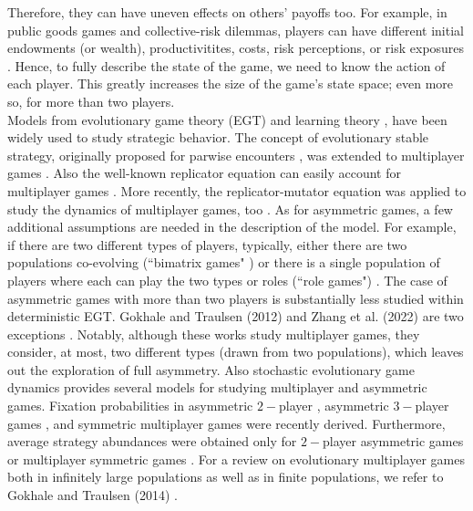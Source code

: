 \documentclass[11pt]{article}
\theoremstyle{plainCl1}
\theoremstyle{plainCl2}
\begin{document}
Therefore, they can have uneven effects on others' payoffs too. For example, in public goods games and collective-risk dilemmas, players can have different initial endowments (or wealth), productivitites, costs, risk perceptions, or risk exposures \cite{Milinski:CC:2011, Vasconcelos:PNAS:2014, Abouchakra:JTB:2014, Hauser:Nature:2019, Merhej:JAIR:2022, Wang:PTRSB:2023}. Hence, to fully describe the state of the game, we need to know the action of each player. This greatly increases the size of the game's state space; even more so, for more than two players. \\


\noindent Models from evolutionary game theory (EGT) \cite{Maynard-Smith:Nature:1973, Maynard-Smith:book:1982, Hofbauer:book:1998, Nowak:book:2006} and learning theory \cite{Sandholm:BioSys:1996, Fudenberg:book:1998b, Macy:PNAS:2002, Pangallo:GEB:2022}, have been widely used to study strategic behavior. 
 The concept of evolutionary stable strategy, originally proposed for parwise encounters \cite{Maynard-Smith:Nature:1973}, was extended to multiplayer games \cite{Palm:JMB:1984, Broom:BMB:1997, Bukowski:IJGT:2004}. Also the well-known replicator equation \cite{Taylor:MB:1978, Hofbauer:book:1998} can easily account for multiplayer games \cite{Hauert:JTB:2006a, gokhale:PNAS:2010, Cressman:PNAS:2014, Pena:JTB:2014}. More recently, the replicator-mutator equation was applied to study the dynamics of multiplayer games, too \cite{Duong:DGAA:2020}. 
As for asymmetric games, a few additional assumptions are needed in the description of the model. For example, if there are two different types of players, typically, either there are two populations co-evolving (``bimatrix games" \cite{Hofbauer:book:1998, Gokhale:PRSB:2012, Tuyls:SciRep:2018}) or there is a single population of players where each can play the two types or roles (``role games") \cite{Hofbauer:book:1998}. 
The case of asymmetric games with more than two players is substantially less studied within deterministic EGT. Gokhale and Traulsen (2012) and Zhang et al. (2022) are two exceptions \cite{Gokhale:PRSB:2012, Zhang:arxiv:2022}. Notably, although these works study multiplayer games, they consider, at most, two different types (drawn from two populations), which leaves out the exploration of full asymmetry.
Also stochastic evolutionary game dynamics \cite{Nowak:Nature:2004, Traulsen:bookchapter:2009} provides several models for studying multiplayer and asymmetric games. 
Fixation probabilities \cite{Fudenberg:TPB:2006} in asymmetric $2-$player \cite{Sekiguchi:DGA:2017}, asymmetric $3-$player games \cite{Sekiguchi:DGAA:2022}, and symmetric multiplayer games \cite{Kurokawa:PRSB:2009, gokhale:PNAS:2010} were recently derived. Furthermore, average strategy abundances \cite{antal:JTB:2009a, antal:JTB:2009b} were obtained only for $2-$player asymmetric games \cite{Ohtsuki:JTB:2010, Sekiguchi:PA:2013} or multiplayer symmetric games \cite{gokhale:JTB:2011, Wu:Games:2013, Kroumi:JMB:2022}. For a review on evolutionary multiplayer games both in infinitely large populations as well as in finite populations, we refer to Gokhale and Traulsen (2014) \cite{Gokhale:DGAA:2014}. 
\end{document}
